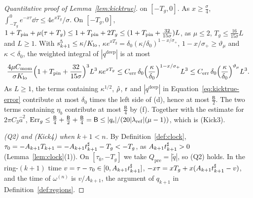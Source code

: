 \begin{proof}[Quantitative proof of Lemma~\ref{lem:kicktrue}]
on $[-T_g,0]$. As $x\ge\frac\sigma4$,
$\int_{-T_g}^0e^{-x\tau}\dd\tau\le4e^{xT_g}/\sigma$. On $[-T_g,0]$,
$1+T_{\mathrm{pin}}+\mu(\tau+T_g)\le1+T_{\mathrm{pin}}+2T_g\le(1+T_{\mathrm{pin}}+\frac{32}{15\sigma})L$, as
$\mu\le2$, $T_g\le\frac{16}{15\sigma}L$ and $L\ge1$. With
$s_{k+1}^5\le\kappa/K_{\mathrm{lo}}$, $\kappa e^{xT_g}=\delta_0(\kappa/\delta_0)^{1-x/\sigma_+}$,
$1-x/\sigma_+\ge\vartheta_\mu$ and $\kappa<\delta_0$, the weighted integral of
$|q^{\mathrm{deep}}|$ is at most
\[
\frac{4\mu C_{\mathrm{mom}}}{\sigma K_{\mathrm{lo}}}\Big(1+T_{\mathrm{pin}}+\frac{32}{15\sigma}\Big)^3L^3\,\kappa e^{xT_g}
\le C_{\mathrm{err}}\,\delta_0\Big(\frac\kappa{\delta_0}\Big)^{1-x/\sigma_+}L^3
\le C_{\mathrm{err}}\,\delta_0\Big(\frac\kappa{\delta_0}\Big)^{\vartheta_\mu}L^3 .
\]
As $L\ge1$, the terms containing $\kappa^{1/2}$, $\hat\rho$, $\mathsf{r}$ and
$|q^{\mathrm{deep}}|$ in Equation~\eqref{eq:kicktrue-error} contribute at most
$\delta_0$ times the left side of (d), hence at most $\frac{\mathsf B}2$.
The two terms containing $\eta_b$ contribute at most $\frac{\mathsf B}4$ by (f).
Together with the estimate for $2\pi C_3\hat a^2$,
$\mathrm{Err}_g\le\frac{\mathsf B}4+\frac{\mathsf B}2+\frac{\mathsf B}4=\mathsf B\le|q_{\mathrm{s}}|/(20|\lambda_{\mathrm{ref}}|(\mu-1))$, which is (Kick3).

\emph{(Q2) and (Kick4) when $k+1<n$.} By Definition~\ref{def:clock},
$\tau_0=-A_{k+1}T_{k+1}=-A_{k+1}t^\sharp_{k+1}-T_g<-T_g$, as $A_{k+1}t^\sharp_{k+1}>0$
(Lemma~\ref{lem:clock}(1)). On $[\tau_0,-T_g]$ we take $Q_{\mathrm{pre}}=|\tilde q|$,
so (Q2) holds. In the ring-$(k+1)$ time $v=\tau-\tau_0\in[0,A_{k+1}t^\sharp_{k+1}]$,
$-x\tau=xT_g+x(A_{k+1}t^\sharp_{k+1}-v)$, and the time of $\omega^{(n)}$ is $v/A_{k+1}$, the
argument of $q_{k+1}$ in Definition~\ref{def:regions}.


\end{proof}
